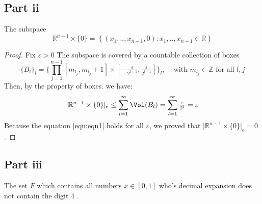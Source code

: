 \subsection{Part ii}

\begin{question}
    The subspace
    $$
        \mathbb{R}^{n-1} \times\{0\}=\left\{\left(x_1, . ., x_{n-1}, 0\right): x_1, . ., x_{n-1} \in \mathbb{R}\right\}
    $$
\end{question}

\begin{answer}
    \begin{proof}
        Fix $\varepsilon > 0$ The subspace is covered by a countable collection of boxes 
        $$\{B_l\}_l=\{\prod_{j=1}^{n-1}[m_{l_j},m_{l_{j}}+1]\times\left[-\tfrac{\varepsilon}{2^{l+1}},\tfrac{\varepsilon}{2^{l+1}}\right]\}_l, \;\;\;\text{ with $m_{l_j} \in \mathbb{Z}$ for all $l,j$}$$
        Then, by the property of boxes. we have:
        \begin{equation}\label{eqn:eqn1}
            \lvert \mathbb{R}^{n-1} \times\{0\} \rvert_e \leq \sum_{l = 1}^{\infty}\Vol(B_l) = \sum_{l = 1}^{\infty}\tfrac{\varepsilon}{2^{l}} = \varepsilon
        \end{equation}
        Because the equation \ref{eqn:eqn1} holds for all $\varepsilon$, we proved that $\lvert \mathbb{R}^{n-1} \times\{0\} \rvert_e = 0$.
    \end{proof}
\end{answer}

\subsection{Part iii}

\begin{question}
   The set $F$ which contains all numbers $x \in[0,1]$ who's decimal expansion does not contain the digit 4 .
\end{question}

